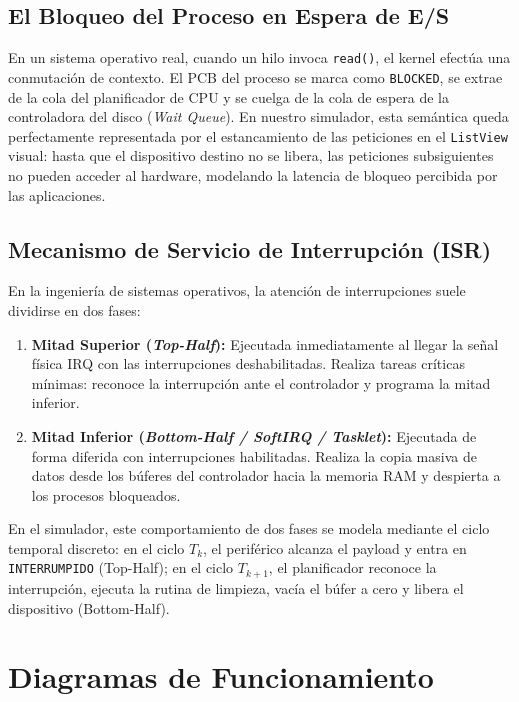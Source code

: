\documentclass[11pt,letterpaper]{article}
\begin{document}
\subsection{El Bloqueo del Proceso en Espera de E/S}
En un sistema operativo real, cuando un hilo invoca \texttt{read()}, el kernel efectúa una conmutación de contexto. El PCB del proceso se marca como \texttt{BLOCKED}, se extrae de la cola del planificador de CPU y se cuelga de la cola de espera de la controladora del disco (\textit{Wait Queue}). En nuestro simulador, esta semántica queda perfectamente representada por el estancamiento de las peticiones en el \texttt{ListView} visual: hasta que el dispositivo destino no se libera, las peticiones subsiguientes no pueden acceder al hardware, modelando la latencia de bloqueo percibida por las aplicaciones.

\subsection{Mecanismo de Servicio de Interrupción (ISR)}
En la ingeniería de sistemas operativos, la atención de interrupciones suele dividirse en dos fases:
\begin{enumerate}
    \item \textbf{Mitad Superior (\textit{Top-Half}):} Ejecutada inmediatamente al llegar la señal física IRQ con las interrupciones deshabilitadas. Realiza tareas críticas mínimas: reconoce la interrupción ante el controlador y programa la mitad inferior.
    \item \textbf{Mitad Inferior (\textit{Bottom-Half / SoftIRQ / Tasklet}):} Ejecutada de forma diferida con interrupciones habilitadas. Realiza la copia masiva de datos desde los búferes del controlador hacia la memoria RAM y despierta a los procesos bloqueados.
\end{enumerate}
En el simulador, este comportamiento de dos fases se modela mediante el ciclo temporal discreto: en el ciclo $T_k$, el periférico alcanza el payload y entra en \texttt{INTERRUMPIDO} (Top-Half); en el ciclo $T_{k+1}$, el planificador reconoce la interrupción, ejecuta la rutina de limpieza, vacía el búfer a cero y libera el dispositivo (Bottom-Half).

\section{Diagramas de Funcionamiento}
\end{document}
